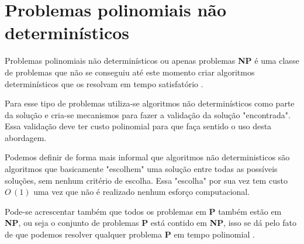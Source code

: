 \section{Problemas polinomiais não determinísticos}
Problemas polinomiais não determinísticos ou apenas problemas \textbf{NP} é uma classe de problemas que não se conseguiu até este momento criar algoritmos determinísticos que os resolvam em tempo satisfatório \cite{goodrichprojeto}. 

Para esse tipo de problemas utiliza-se algoritmos não determinísticos como parte da solução e cria-se mecanismos para fazer a validação da solução "encontrada". Essa validação deve ter custo polinomial para que faça sentido o uso desta abordagem. 

Podemos definir de forma mais informal que algoritmos não deterministicos são algoritmos que basicamente "escolhem" uma solução entre todas as possíveis soluções, sem nenhum critério de escolha. Essa "escolha" por sua vez tem custo $O\,(1)$ uma vez que não é realizado nenhum esforço computacional.

Pode-se acrescentar também que todos os problemas em \textbf{P} também estão em \textbf{NP}, ou seja o conjunto de problemas \textbf{P} está contido em \textbf{NP}, isso se dá pelo fato de que podemos resolver qualquer problema \textbf{P} em tempo polinomial \cite{leisersonalgoritmos}. 

